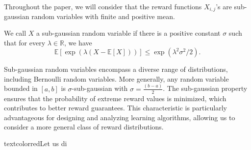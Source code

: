 \iffalse 
\begin{definition}[Proportionality]
$A \pi \geq  \frac{1}{\min(n,k)} A \mathds{1}$. 

Here $\mathds{1}$ is all-ones vector.
\end{definition}
\fi 


Throughout the paper, we will consider that the reward functions $X_{i,j}$'s are  sub-gaussian  random variables with finite and positive mean. 

\begin{definition}
 We call $X$  a sub-gaussian random variable if  there is a positive constant $\sigma$ such that for every $\lambda \in \mathbb{R}$,  we have 
\begin{equation}
    \mathbb{E}\left[\exp{\left(\lambda(X-\mathbb{E}[X])\right)}\right]\leq \exp(\lambda^2\sigma^2/2).
\end{equation}
\end{definition}

Sub-gaussian random variables encompass a diverse range of distributions, including Bernoulli random variables. More generally, any random variable bounded in $[a, b]$ is $\sigma$-sub-gaussian with $\sigma=\frac{(b-a)}{2}$. The sub-gaussian property ensures that the probability of extreme reward values is minimized, which contributes to better reward guarantees. This characteristic is particularly advantageous for designing and analyzing learning algorithms, allowing us to consider a more general class of reward distributions.


 







\iffalse 
\begin{definition}[Equitability]
textcolor{red}{Let us di}
\end{definition}

\begin{definition}
\end{definition}


